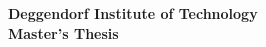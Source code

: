 \thispagestyle{empty}
\begin{titlepage}

  \begin{center}
    \vspace*{0.5cm}
    {\textbf{\large Deggendorf Institute of Technology}}\\[1.0cm] %
    {\textbf{\huge Master's Thesis}}

    \vspace*{\fill}
    {\textbf{\large \thesistitleEN}}

    \vspace*{\fill}
    {\textbf{\large \student}}\\
    {\textbf{\large \Year}}
  \end{center}


\end{titlepage}